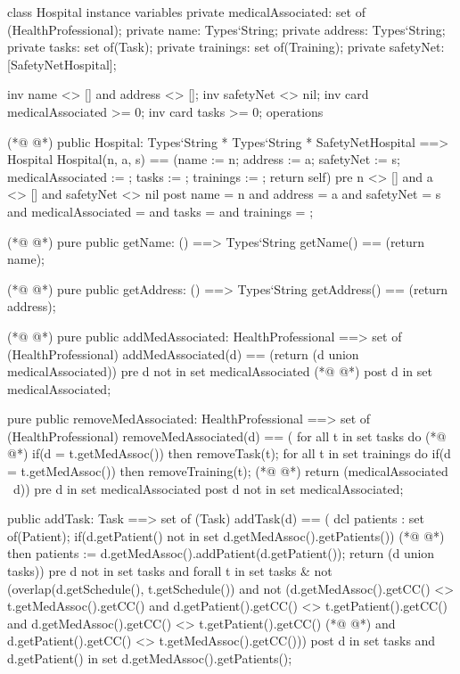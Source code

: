 \begin{vdmpp}[breaklines=true]
class Hospital
instance variables
  private medicalAssociated: set of (HealthProfessional);
  private name: Types`String;
  private address: Types`String;
  private tasks: set of(Task);
  private trainings: set of(Training);
  private safetyNet: [SafetyNetHospital];
 
 inv name <> [] and address <> [];
 inv safetyNet <> nil; 
 inv card medicalAssociated >= 0;
 inv card tasks >= 0;
operations

(*@
\label{Hospital:16}
@*)
 public Hospital: Types`String * Types`String * SafetyNetHospital ==> Hospital
  Hospital(n, a, s) == (name := n; address := a; safetyNet := s; medicalAssociated := {}; tasks := {}; trainings := {}; return self)
 pre n <> [] and a <> [] and safetyNet <> nil
 post name = n and address = a and safetyNet = s and medicalAssociated = {} and tasks = {} and trainings = {};
 
(*@
\label{getName:21}
@*)
 pure public getName: () ==> Types`String
  getName() == (return name);
 
(*@
\label{getAddress:24}
@*)
 pure public getAddress: () ==> Types`String
  getAddress() == (return address);
 
(*@
\label{getSafetyNet:27}
@*)
 pure public addMedAssociated: HealthProfessional ==> set of (HealthProfessional)
  addMedAssociated(d) == (return ({d} union medicalAssociated))
 pre d not in set medicalAssociated
(*@
\label{addMedAssociated:30}
@*)
 post d in set medicalAssociated;
  
 pure public removeMedAssociated: HealthProfessional ==> set of (HealthProfessional)
  removeMedAssociated(d) == (
                for all t in set tasks do
(*@
\label{removeMedAssociated:35}
@*)
                 if(d = t.getMedAssoc())
                  then removeTask(t);
                for all t in set trainings do
                 if(d = t.getMedAssoc())
                  then removeTraining(t);
(*@
\label{addTask:40}
@*)
                return (medicalAssociated \ {d}))
 pre d in set medicalAssociated
 post d not in set medicalAssociated;
 
 public addTask: Task ==> set of (Task)
  addTask(d) == (
          dcl patients : set of(Patient);
          if(d.getPatient() not in set d.getMedAssoc().getPatients())
(*@
\label{removeTask:48}
@*)
           then patients := d.getMedAssoc().addPatient(d.getPatient());
          return ({d} union tasks))
 pre d not in set tasks and forall t in set tasks & 
  not (overlap(d.getSchedule(), t.getSchedule()) and not (d.getMedAssoc().getCC() <> t.getMedAssoc().getCC() and 
    d.getPatient().getCC() <> t.getPatient().getCC() and d.getMedAssoc().getCC() <> t.getPatient().getCC()
(*@
\label{addTraining:53}
@*)
    and d.getPatient().getCC() <> t.getMedAssoc().getCC()))
 post d in set tasks and d.getPatient() in set d.getMedAssoc().getPatients();
  

\end{vdmpp}
